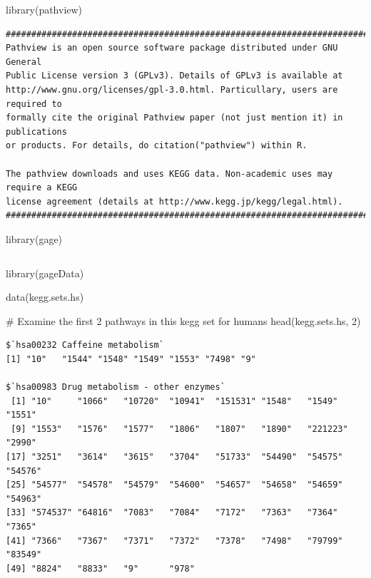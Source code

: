 \documentclass[
  letterpaper,
  DIV=11,
  numbers=noendperiod]{scrartcl}
\newenvironment{Shaded}{\begin{snugshade}}{\end{snugshade}}
\newcommand{\CommentTok}[1]{\textcolor[rgb]{0.37,0.37,0.37}{#1}}
\newcommand{\DecValTok}[1]{\textcolor[rgb]{0.68,0.00,0.00}{#1}}
\newcommand{\FunctionTok}[1]{\textcolor[rgb]{0.28,0.35,0.67}{#1}}
\newcommand{\NormalTok}[1]{\textcolor[rgb]{0.00,0.23,0.31}{#1}}
\begin{document}
\begin{Shaded}
\begin{Highlighting}[]
\FunctionTok{library}\NormalTok{(pathview)}
\end{Highlighting}
\end{Shaded}

\begin{verbatim}
##############################################################################
Pathview is an open source software package distributed under GNU General
Public License version 3 (GPLv3). Details of GPLv3 is available at
http://www.gnu.org/licenses/gpl-3.0.html. Particullary, users are required to
formally cite the original Pathview paper (not just mention it) in publications
or products. For details, do citation("pathview") within R.

The pathview downloads and uses KEGG data. Non-academic uses may require a KEGG
license agreement (details at http://www.kegg.jp/kegg/legal.html).
##############################################################################
\end{verbatim}

\begin{Shaded}
\begin{Highlighting}[]
\FunctionTok{library}\NormalTok{(gage)}
\end{Highlighting}
\end{Shaded}

\begin{verbatim}
\end{verbatim}

\begin{Shaded}
\begin{Highlighting}[]
\FunctionTok{library}\NormalTok{(gageData)}

\FunctionTok{data}\NormalTok{(kegg.sets.hs)}

\CommentTok{\# Examine the first 2 pathways in this kegg set for humans}
\FunctionTok{head}\NormalTok{(kegg.sets.hs, }\DecValTok{2}\NormalTok{)}
\end{Highlighting}
\end{Shaded}

\begin{verbatim}
$`hsa00232 Caffeine metabolism`
[1] "10"   "1544" "1548" "1549" "1553" "7498" "9"   

$`hsa00983 Drug metabolism - other enzymes`
 [1] "10"     "1066"   "10720"  "10941"  "151531" "1548"   "1549"   "1551"  
 [9] "1553"   "1576"   "1577"   "1806"   "1807"   "1890"   "221223" "2990"  
[17] "3251"   "3614"   "3615"   "3704"   "51733"  "54490"  "54575"  "54576" 
[25] "54577"  "54578"  "54579"  "54600"  "54657"  "54658"  "54659"  "54963" 
[33] "574537" "64816"  "7083"   "7084"   "7172"   "7363"   "7364"   "7365"  
[41] "7366"   "7367"   "7371"   "7372"   "7378"   "7498"   "79799"  "83549" 
[49] "8824"   "8833"   "9"      "978"   
\end{verbatim}
\end{document}
